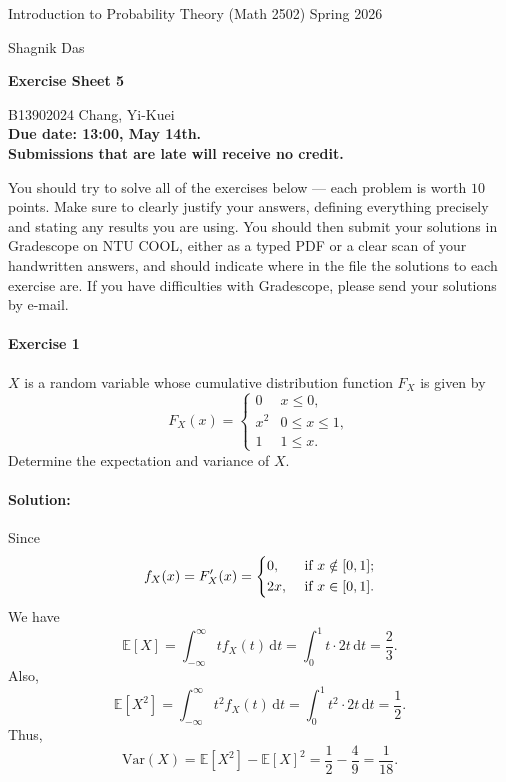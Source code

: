 \documentclass[a4paper,12pt]{article}
\newcommand{\courseTitle}{Introduction to Probability Theory (Math 2502)}
\newcommand{\semester}{Spring 2026}
\newcommand{\instructorA}{Shagnik Das}
\newcommand{\instructorB}{}
\newcommand{\sheetNumber}{5}
\newcommand{\dueDate}{13:00, May 14th.}
\newcommand{\lateWarning}{Submissions that are late will receive no credit.}
\newcommand{\buildtitle}[4]{
\begin{flushleft}
{\large
#1
\hfill{}
#2
\par
#3
}
\end{flushleft}
\vskip 4pt
\begin{center}
{\large\bfseries#4\par}
\end{center}
\bigskip
}
\begin{document}
\buildtitle{\courseTitle{}}{\semester}{\instructorA{} \hfill \instructorB{}}{Exercise Sheet \sheetNumber{}}

\vspace{-0.2in}

\begin{center}

{B13902024 Chang, Yi-Kuei \\ \bf Due date: \dueDate \\ \lateWarning}

\end{center}

\noindent You should try to solve all of the exercises below --- each problem is worth $10$ points. Make sure to clearly justify your answers, defining everything precisely and stating any results you are using. You should then submit your solutions in Gradescope on NTU COOL, either as a typed PDF or a clear scan of your handwritten answers, and should indicate where in the file the solutions to each exercise are. If you have difficulties with Gradescope, please send your solutions by e-mail.

\paragraph{Exercise 1}  $X$ is a random variable whose cumulative distribution function $F_X$ is given by
\[ F_X(x) = \begin{cases}
	0 & x \le 0, \\
	x^2 & 0 \le x \le 1, \\
	1 & 1\le x.
	\end{cases} \]
Determine the expectation and variance of $X$.

\paragraph{Solution:} Since 
\[
	f_X(x) = F_X^{\prime} (x) = \begin{dcases}
		0, &\text{ if } x \notin [0, 1] ;\\
		2x, &\text{ if } x \in [0, 1].
	\end{dcases}
\]
We have 
\[
	\mathbb{E} [X] = \int _{-\infty }^{\infty } t f_X(t) \, \mathrm{d} t = \int _0^1 t \cdot 2t \, \mathrm{d} t = \frac{2}{3}.  
\]
Also,
\[
	\mathbb{E} [X^2] = \int _{-\infty }^{\infty } t^2 f_X(t) \, \mathrm{d} t = \int _0^1 t^2 \cdot 2t \, \mathrm{d} t = \frac{1}{2}.  
\]
Thus, 
\[
	\mathrm{Var}(X) = \mathbb{E} [X^2] - \mathbb{E} [X]^2 = \frac{1}{2} - \frac{4}{9} = \frac{1}{18}.
\]
\end{document}
